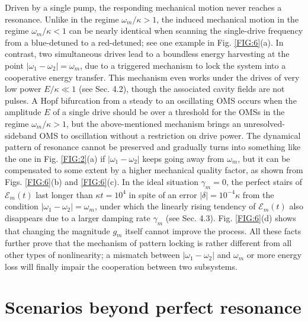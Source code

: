 \documentclass[a4paper,fleqn]{cas-dc}
\begin{document}
Driven by a single pump, the responding mechanical motion never reaches a resonance. Unlike in the regime $\omega_m/\kappa>1$, the induced mechanical motion in the regime $\omega_m/\kappa<1$ can be nearly identical when scanning the single-drive frequency from a blue-detuned to a red-detuned; see one example in Fig. \ref{FIG:6}(a). In contrast, two simultaneous drives lead to a boundless energy harvesting at the point $|\omega_1-\omega_2|=\omega_m$, due to a triggered mechanism to lock the system into a cooperative energy transfer. This mechanism even works under the drives of very low power $E/\kappa\ll 1$ (see Sec. 4.2), though the associated cavity fields are not pulses. A Hopf bifurcation from a steady to an oscillating OMS occurs when the amplitude $E$ of a single drive should be over a threshold for the OMSs in the regime $\omega_m/\kappa>1$, but the above-mentioned mechanism brings an unresolved-sideband OMS to oscillation without a restriction on drive power. The dynamical pattern of resonance cannot be preserved and gradually turns into something like the one in Fig. \ref{FIG:2}(a) if $|\omega_1-\omega_2|$ keeps going away from $\omega_m$, but it can be compensated to some extent by a higher mechanical quality factor, as shown from Figs. \ref{FIG:6}(b) and \ref{FIG:6}(c). In the ideal situation $\gamma_m=0$, the perfect stairs of $\mathcal{E}_m(t)$ last longer than $\kappa t=10^4$ in spite of an error $|\delta|=10^{-4}\kappa$ from the condition $|\omega_1-\omega_2|=\omega_m$, under which the linearly rising tendency of $\mathcal{E}_m(t)$ also disappears due to a larger damping rate $\gamma_m$ (see Sec. 4.3). Fig. \ref{FIG:6}(d) shows that changing the magnitude $g_m$ itself cannot improve the process. All these facts further prove that the mechanism of pattern locking is rather different from all other types of nonlinearity; a mismatch between $|\omega_1-\omega_2|$ and $\omega_m$ or more energy loss will finally impair the cooperation between two subsystems. 

\section{Scenarios beyond perfect resonance}
\end{document}
